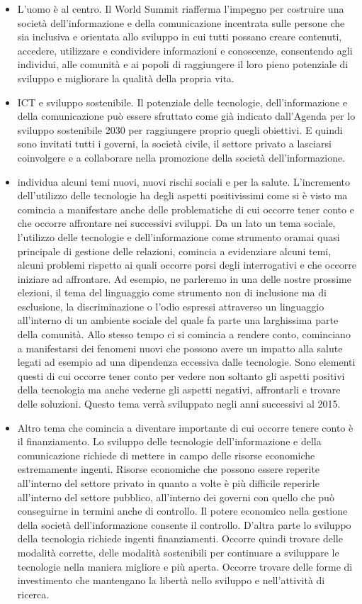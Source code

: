 \begin{itemize}
    \item L'uomo è al centro.  Il World Summit riafferma l'impegno per costruire una società dell'informazione e della comunicazione incentrata sulle persone che sia inclusiva e orientata allo sviluppo in cui tutti possano creare contenuti, accedere, utilizzare e condividere informazioni e conoscenze, consentendo agli individui, alle comunità e ai popoli di raggiungere il loro pieno potenziale di sviluppo e migliorare la qualità della propria vita.
    \item ICT e sviluppo sostenibile. Il potenziale delle tecnologie, dell'informazione e della comunicazione può essere sfruttato come già indicato dall'Agenda per lo sviluppo sostenibile 2030 per raggiungere proprio quegli obiettivi. E quindi sono invitati tutti i governi, la società civile, il settore privato a lasciarsi coinvolgere e a collaborare nella promozione della società dell'informazione.
    \item individua alcuni temi nuovi, nuovi rischi sociali e per la salute. L'incremento dell'utilizzo delle tecnologie ha degli aspetti positivissimi come si è visto ma comincia a manifestare anche delle problematiche di cui occorre tener conto e che occorre affrontare nei successivi sviluppi. Da un lato un tema sociale, l'utilizzo delle tecnologie e dell'informazione come strumento oramai quasi principale di gestione delle relazioni, comincia a evidenziare alcuni temi, alcuni problemi rispetto ai quali occorre porsi degli interrogativi e che occorre iniziare ad affrontare. Ad esempio, ne parleremo in una delle nostre prossime elezioni, il tema del linguaggio come strumento non di inclusione ma di esclusione, la discriminazione o l'odio espressi attraverso un linguaggio all'interno di un ambiente sociale del quale fa parte una larghissima parte della comunità. Allo stesso tempo ci si comincia a rendere conto, cominciano a manifestarsi dei fenomeni nuovi che possono avere un impatto alla salute legati ad esempio ad una dipendenza eccessiva dalle tecnologie. Sono elementi questi di cui occorre tener conto per vedere non soltanto gli aspetti positivi della tecnologia ma anche vederne gli aspetti negativi, affrontarli e trovare delle soluzioni. Questo tema verrà sviluppato negli anni successivi al 2015.
    \item Altro tema che comincia a diventare importante di cui occorre tenere conto è il finanziamento. Lo sviluppo delle tecnologie dell'informazione e della comunicazione richiede di mettere in campo delle risorse economiche estremamente ingenti. Risorse economiche che possono essere reperite all'interno del settore privato in quanto a volte è più difficile reperirle all'interno del settore pubblico, all'interno dei governi con quello che può conseguirne in termini anche di controllo. Il potere economico nella gestione della società dell'informazione consente il controllo. D'altra parte lo sviluppo della tecnologia richiede ingenti finanziamenti. Occorre quindi trovare delle modalità corrette, delle modalità sostenibili per continuare a sviluppare le tecnologie nella maniera migliore e più aperta. Occorre trovare delle forme di investimento che mantengano la libertà nello sviluppo e nell'attività di ricerca. 

\end{itemize}
